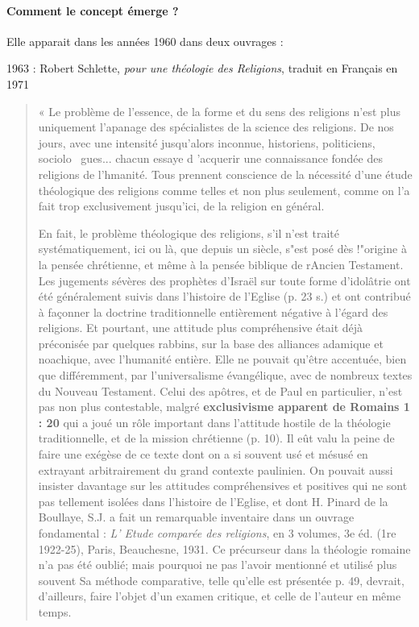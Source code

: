 \paragraph{Comment le concept émerge ?} Elle apparait dans les années 1960 dans deux ouvrages : 
\bi 
\item 1963 : Robert Schlette, \textit{pour une théologie des Religions}, traduit en Français en 1971
\begin{quote}
  « Le problème de l'essence, de la forme et du sens des religions n'est plus
 uniquement l'apanage des spécialistes de la science des religions. De nos
jours, avec une intensité jusqu'alors inconnue, historiens, politiciens, sociolo~
gues... chacun essaye d 'acquerir une connaissance fondée des religions de l'hmanité. Tous prennent conscience de la nécessité d'une étude théologique des religions comme
 telles et non plus seulement, comme on l'a fait trop exclusivement jusqu'ici,
 de la religion en général. 
 
En fait, le problème théologique des religions, s'il n'est traité systématiquement,
ici ou là, que depuis un siècle, s"est posé dès !"origine à la pensée
chrétienne, et même à la pensée biblique de rAncien Testament. Les jugements
sévères des prophètes d'Israël sur toute forme d'idolâtrie ont été généralement suivis dans l'histoire de l'Eglise (p. 23 s.) et ont contribué à façonner
la doctrine traditionnelle entièrement négative à l'égard des religions. Et
pourtant, une attitude plus compréhensive était déjà préconisée par quelques
rabbins, sur la base des alliances adamique et noachique, avec l'humanité entière.
Elle ne pouvait qu'être accentuée, bien que différemment, par l'universalisme
évangélique, avec de nombreux textes du Nouveau Testament. Celui
des apôtres, et de Paul en particulier, n'est pas non plus contestable, malgré
\textbf{exclusivisme apparent de Romains 1 : 20}  qui a joué un rôle important
dans l'attitude hostile de la théologie traditionnelle, et de la mission chrétienne
(p. 10). Il eût valu la peine de faire une exégèse de ce texte dont on a si
souvent usé et mésusé en extrayant arbitrairement du grand contexte paulinien.
On pouvait aussi insister davantage sur les attitudes compréhensives et
positives qui ne sont pas tellement isolées dans l'histoire de l'Eglise, et dont
H. Pinard de la Boullaye, S.J. a fait un remarquable inventaire dans un ouvrage
fondamental : \textit{L' Etude comparée des religions}, en 3 volumes, 3e éd.
(1re 1922-25), Paris, Beauchesne, 1931. Ce précurseur dans la théologie romaine
n'a pas été oublié; mais pourquoi ne pas l'avoir mentionné et utilisé plus
souvent Sa méthode comparative, telle qu'elle est présentée p. 49, devrait,
d'ailleurs, faire l'objet d'un examen critique, et celle de l'auteur en même
temps. 


\end{quote}
